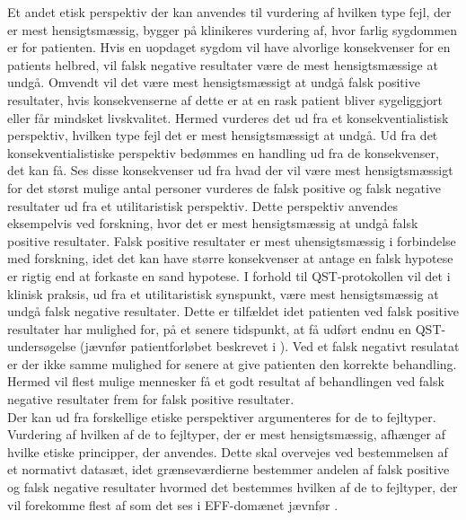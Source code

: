 Et andet etisk perspektiv der kan anvendes til vurdering af hvilken type fejl, der er mest hensigtsmæssig, bygger på klinikeres vurdering af, hvor farlig sygdommen er for patienten. Hvis en uopdaget sygdom vil have alvorlige konsekvenser for en patients helbred, vil falsk negative resultater være de mest hensigtsmæssige at undgå. Omvendt vil det være mest hensigtsmæssigt at undgå falsk positive resultater, hvis konsekvenserne af dette er at en rask patient bliver sygeliggjort eller får mindsket livskvalitet. \citep{Kraemer2011} Hermed vurderes det ud fra et konsekventialistisk perspektiv, hvilken type fejl det er mest hensigtsmæssigt at undgå. Ud fra det konsekventialistiske perspektiv bedømmes en handling ud fra de konsekvenser, det kan få. Ses disse konsekvenser ud fra hvad der vil være mest hensigtsmæssigt for det størst mulige antal personer vurderes de falsk positive og falsk negative resultater ud fra et utilitaristisk perspektiv. Dette perspektiv anvendes eksempelvis ved forskning, hvor det er mest hensigtsmæssig at undgå falsk positive resultater. Falsk positive resultater er mest uhensigtsmæssig i forbindelse med forskning, idet det kan have større konsekvenser at antage en falsk hypotese er rigtig end at forkaste en sand hypotese. \citep{Kraemer2011} I forhold til QST-protokollen vil det i klinisk praksis, ud fra et utilitaristisk synspunkt, være mest hensigtsmæssig at undgå falsk negative resultater. Dette er tilfældet idet patienten ved falsk positive resultater har mulighed for, på et senere tidspunkt, at få udført endnu en QST-undersøgelse (jævnfør patientforløbet beskrevet i ). Ved et falsk negativt resulatat er der ikke samme mulighed for senere at give patienten den korrekte behandling. Hermed vil flest mulige mennesker få et godt resultat af behandlingen ved falsk negative resultater frem for falsk positive resultater. \\
Der kan ud fra forskellige etiske perspektiver argumenteres for de to fejltyper. Vurdering af hvilken af de to fejltyper, der er mest hensigtsmæssig, afhænger af hvilke etiske principper, der anvendes. Dette skal overvejes ved bestemmelsen af et normativt datasæt, idet grænseværdierne bestemmer andelen af falsk positive og falsk negative resultater hvormed det bestemmes hvilken af de to fejltyper, der vil forekomme flest af som det ses i EFF-domænet jævnfør .  

